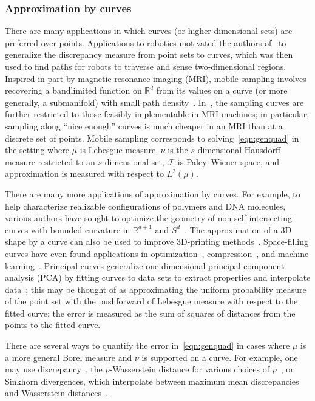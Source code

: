 \documentclass[12pt]{article}
\theoremstyle{plain}
\theoremstyle{definition}
\theoremstyle{remark}
\newcommand{\cF}{\mathcal{F}}
\newcommand{\bR}{\mathbb{R}}
\begin{document}
\subsubsection{Approximation by curves}

There are many applications in which curves (or higher-dimensional sets) are preferred over points. 
Applications to robotics motivated the authors of~\cite{RamamoorthyRW:08} to generalize the discrepancy measure from point sets to curves, which was then used to find paths for robots to traverse and sense two-dimensional regions.
Inspired in part by magnetic resonance imaging (MRI), mobile sampling involves recovering a bandlimited function on $\bR^d$ from its values on a curve (or more generally, a submanifold) with small path density~\cite{BenedettoW:00,GrochenigRUV:15,JamingNR:21,JayeM:22,UnnikrishnanV:13,UnnikrishnanV:13b,BoyerCCKW:16}.
In~\cite{BoyerCCKW:16}, the sampling curves are further restricted to those feasibly implementable in MRI machines; in particular, sampling along ``nice enough'' curves is much cheaper in an MRI than at a discrete set of points.
Mobile sampling corresponds to solving~\eqref{eqn:genquad} in the setting where $\mu$ is Lebesgue measure, $\nu$ is the $s$-dimensional Hausdorff measure restricted to an $s$-dimensional set, $\cF$ is Paley--Wiener space, and approximation is measured with respect to $L^2(\mu)$.

There are many more applications of approximation by curves.
For example, to help characterize realizable configurations of polymers and DNA molecules, various authors have sought to optimize the geometry of non-self-intersecting curves with bounded curvature in $\bR^{d+1}$ and $S^d$~\cite{CantarellaKS:02,GerlachM:11,GerlachM:11b,YuSC:21}.
The approximation of a 3D shape by a curve can also be used to improve 3D-printing methods~\cite{ChenSGCZ:17}.
Space-filling curves have even found applications in optimization~\cite{Goertzel:99}, compression~\cite{ChenYW:22}, and machine learning~\cite{TsinganosCCJS:21}. 
Principal curves generalize one-dimensional principal component analysis (PCA) by fitting curves to data sets to extract properties and interpolate data~\cite{HastieS:89,Hauberg:15,KeglKLZ:00,LeeKO:21}; this may be thought of as approximating the uniform probability measure of the point set with the pushforward of Lebesgue measure with respect to the fitted curve; the error is measured as the sum of squares of distances from the points to the fitted curve.

There are several ways to quantify the error in~\eqref{eqn:genquad} in cases where $\mu$ is a more general Borel measure and $\nu$ is supported on a curve.
For example, one may use discrepancy~\cite{EhlerGNS:21}, the $p$-Wasserstein distance for various choices of $p$~\cite{LebratGKW:19,ChauffertCKW:17,ChambolleDM:25,LuS:16}, or Sinkhorn divergences, which interpolate between maximum mean discrepancies and Wasserstein distances~\cite{FeydySVATP:19}.
\end{document}
